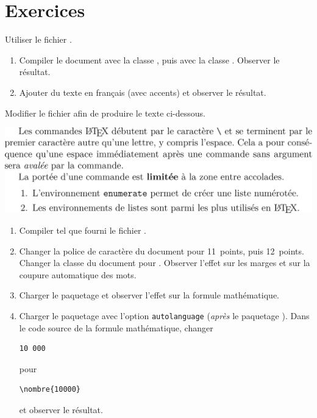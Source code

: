 
\section{Exercices}
\label{sec:bases:exercices}

\begin{exercice}[nosol]
  Utiliser le fichier .
  \begin{enumerate}
  \item Compiler le document avec la classe , puis avec
    la classe . Observer le résultat.
  \item Ajouter du texte en français (avec accents) et observer le
    résultat.
  \end{enumerate}
\end{exercice}

\begin{exercice}[nosol]
  \label{ex:base:commandes}
  Modifier le fichier  afin
  de produire le texte ci-dessous.
  \begin{center}
    \includegraphics[width=0.95\linewidth]{exercice_commandes-output}
  \end{center}
\end{exercice}

\begin{exercice}[nosol]
  \begin{enumerate}
  \item Compiler tel que fourni le fichier
    .
  \item Changer la police de caractère du document pour 11~points,
    puis 12~points. Changer la classe du document pour .
    Observer l'effet sur les marges et sur la coupure automatique des
    mots.
  \item Charger le paquetage  et observer l'effet sur la
    formule mathématique.
  \item Charger le paquetage  avec l'option
    \verb=autolanguage= (\emph{après} le paquetage ). Dans
    le code source de la formule mathématique, changer
\begin{lstlisting}
10 000
\end{lstlisting}
    pour
\begin{lstlisting}
\nombre{10000}
\end{lstlisting}
    et observer le résultat.
  \end{enumerate}
\end{exercice}


